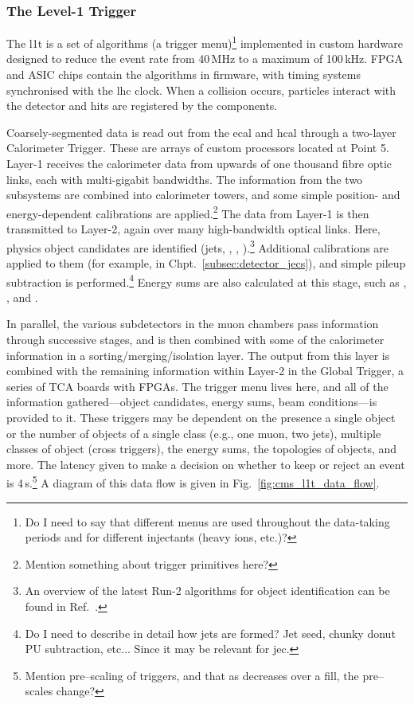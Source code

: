 \subsubsection{The Level-1 Trigger}
\label{subsubsec:detector_l1t}

The \acrlong{l1t} is a set of algorithms (a trigger menu)\footnote{Do I need to say that different menus are used throughout the data-taking periods and for different injectants (heavy ions, etc.)?} implemented in custom hardware designed to reduce the event rate from 40\,MHz to a maximum of 100\,kHz. FPGA and ASIC chips contain the algorithms in firmware, with timing systems synchronised with the \acrshort{lhc} clock. When a collision occurs, particles interact with the detector and hits are registered by the components.

Coarsely-segmented data is read out from the \acrshort{ecal} and \acrshort{hcal} through a two-layer Calorimeter Trigger. These are arrays of custom processors located at Point 5. Layer-1 receives the calorimeter data from upwards of one thousand fibre optic links, each with multi-gigabit bandwidths. The information from the two subsystems are combined into calorimeter towers, and some simple position- and energy-dependent calibrations are applied.\footnote{Mention something about trigger primitives here?} The data from Layer-1 is then transmitted to Layer-2, again over many high-bandwidth optical links. Here, physics object candidates are identified (\glspl{jet}, \Pe, \Pphoton, \Ptau).\footnote{An overview of the latest Run-2 algorithms for object identification can be found in Ref.~.} Additional calibrations are applied to them (for example, in Chpt.~\ref{subsec:detector_jecs}), and simple \gls{pileup} subtraction is performed.\footnote{Do I need to describe in detail how jets are formed? Jet seed, chunky donut PU subtraction, etc... Since it may be relevant for \acrshort{jec}.} Energy sums are also calculated at this stage, such as \etmiss, \HT, and \mht.

In parallel, the various subdetectors in the muon chambers pass information through successive stages, and is then combined with some of the calorimeter information in a sorting/merging/isolation layer. The output from this layer is combined with the remaining information within Layer-2 in the Global Trigger, a series of \si{\micro}TCA boards with FPGAs. The trigger menu lives here, and all of the information gathered---object candidates, energy sums, beam conditions---is provided to it. These triggers may be dependent on the presence a single object or the number of objects of a single class (e.g., one muon, two \glspl{jet}), multiple classes of object (cross triggers), the energy sums, the topologies of objects, and more. The latency given to make a decision on whether to keep or reject an event is 4\,\si{\micro}s.\footnote{Mention pre--scaling of triggers, and that as \lumi decreases over a fill, the pre--scales change?} A diagram of this data flow is given in Fig.~\ref{fig:cms_l1t_data_flow}.


